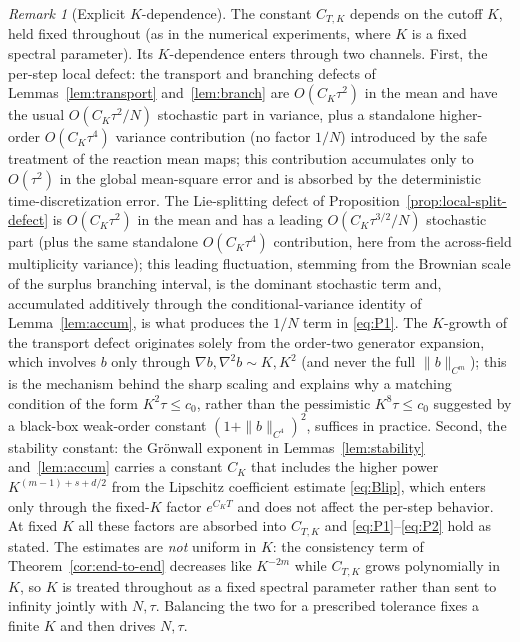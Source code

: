 \documentclass[a4paper,fleqn]{cas-sc}
\theoremstyle{definition}
\theoremstyle{remark}
\newtheorem{remark}[theorem]{Remark}
\begin{document}
\begin{remark}[Explicit $K$-dependence]\label{rem:K-scaling}
The constant $C_{T,K}$ depends on the cutoff $K$, held fixed throughout (as in the
numerical experiments, where $K$ is a fixed spectral parameter). Its
$K$-dependence enters through two channels. First, the per-step local defect: the
transport and branching defects of Lemmas~\ref{lem:transport}
and~\ref{lem:branch} are $O(C_K\tau^2)$ in the mean and have the usual
$O(C_K\tau^2/N)$ stochastic part in variance, plus a standalone higher-order
$O(C_K\tau^4)$ variance contribution (no factor $1/N$) introduced by the safe
treatment of the reaction mean maps; this contribution accumulates only to
$O(\tau^2)$ in the global mean-square error and is absorbed by the deterministic
time-discretization error. The Lie-splitting defect of Proposition~\ref{prop:local-split-defect} is
$O(C_K\tau^2)$ in the mean and has a leading $O(C_K\tau^{3/2}/N)$ stochastic part (plus
the same standalone $O(C_K\tau^4)$ contribution, here from the across-field
multiplicity variance); this leading
fluctuation, stemming from the Brownian scale of the surplus branching interval,
is the dominant stochastic term and, accumulated additively through the
conditional-variance identity of Lemma~\ref{lem:accum}, is what produces the $1/N$ term in \eqref{eq:P1}. The $K$-growth of the transport defect originates solely from the
order-two generator expansion, which involves $b$ only through $\nabla b,\nabla^2b
\sim K,K^2$ (and never the full $\|b\|_{C^m}$); this is the mechanism behind the
sharp scaling and explains why a matching condition of the form $K^2\tau\le c_0$,
rather than the pessimistic $K^8\tau\le c_0$ suggested by a black-box weak-order
constant $(1+\|b\|_{C^4})^2$, suffices in practice. Second, the stability constant:
the Gr\"onwall exponent in Lemmas~\ref{lem:stability} and~\ref{lem:accum} carries a
constant $C_K$ that includes the higher power $K^{(m-1)+s+d/2}$ from the Lipschitz
coefficient estimate \eqref{eq:Blip}, which enters only through the fixed-$K$
factor $e^{C_K T}$ and does not affect the per-step behavior. At fixed $K$ all
these factors are absorbed into $C_{T,K}$ and \eqref{eq:P1}--\eqref{eq:P2} hold as
stated. The estimates are \emph{not} uniform in $K$: the consistency term of
Theorem~\ref{cor:end-to-end} decreases like $K^{-2m}$ while $C_{T,K}$ grows
polynomially in $K$, so $K$ is treated throughout as a fixed spectral parameter
rather than sent to infinity jointly with $N,\tau$. Balancing the two for a
prescribed tolerance fixes a finite $K$ and then drives $N,\tau$.
\end{remark}
\end{document}
